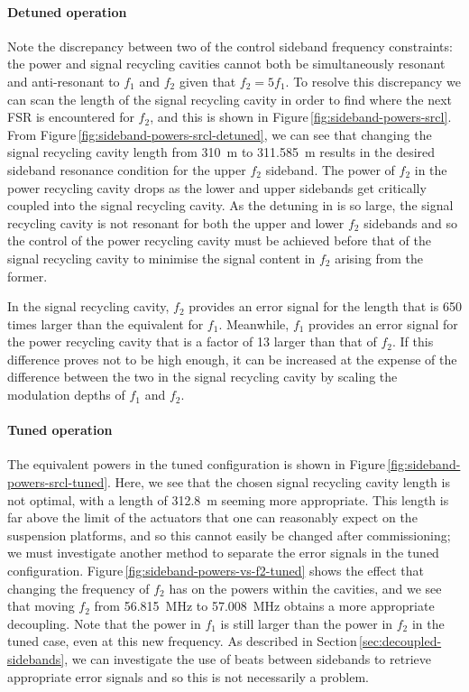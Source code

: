 \paragraph{Detuned operation}
Note the discrepancy between two of the control sideband frequency constraints: the power and signal recycling cavities cannot both be simultaneously resonant and anti-resonant to $f_1$ and $f_2$ given that $f_2 = 5 f_1$. To resolve this discrepancy we can scan the length of the signal recycling cavity in order to find where the next \gls{FSR} is encountered for $f_2$, and this is shown in Figure\,\ref{fig:sideband-powers-srcl}. From Figure\,\ref{fig:sideband-powers-srcl-detuned}, we can see that changing the signal recycling cavity length from \SI{310}{\meter} to \SI{311.585}{\meter} results in the desired sideband resonance condition for the upper $f_2$ sideband. The power of $f_2$ in the power recycling cavity drops as the lower and upper sidebands get critically coupled into the signal recycling cavity. As the detuning in \ETLF{} is so large, the signal recycling cavity is not resonant for both the upper and lower $f_2$ sidebands and so the control of the power recycling cavity must be achieved before that of the signal recycling cavity to minimise the signal content in $f_2$ arising from the former.

In the signal recycling cavity, $f_2$ provides an error signal for the length that is \num{650} times larger than the equivalent for $f_1$. Meanwhile, $f_1$ provides an error signal for the power recycling cavity that is a factor of \num{13} larger than that of $f_2$. If this difference proves not to be high enough, it can be increased at the expense of the difference between the two in the signal recycling cavity by scaling the modulation depths of $f_1$ and $f_2$.

\paragraph{Tuned operation}
The equivalent powers in the tuned configuration is shown in Figure\,\ref{fig:sideband-powers-srcl-tuned}. Here, we see that the chosen signal recycling cavity length is not optimal, with a length of \SI{312.8}{\meter} seeming more appropriate. This length is far above the limit of the actuators that one can reasonably expect on the suspension platforms, and so this cannot easily be changed after commissioning; we must investigate another method to separate the error signals in the tuned configuration. Figure\,\ref{fig:sideband-powers-vs-f2-tuned} shows the effect that changing the frequency of $f_2$ has on the powers within the cavities, and we see that moving $f_2$ from \SI{56.815}{\mega\hertz} to \SI{57.008}{\mega\hertz} obtains a more appropriate decoupling. Note that the power in $f_1$ is still larger than the power in $f_2$ in the tuned case, even at this new frequency. As described in Section\,\ref{sec:decoupled-sidebands}, we can investigate the use of beats between sidebands to retrieve appropriate error signals and so this is not necessarily a problem.

